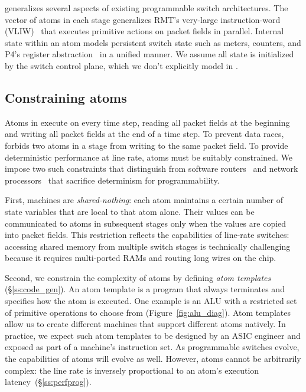 \absmachine generalizes several aspects of existing programmable switch
architectures. The vector of atoms in each stage generalizes RMT's very-large
instruction-word (VLIW)~\cite{rmt} that executes primitive actions on packet
fields in parallel. Internal state within an atom models persistent switch
state such as meters, counters, and P4's register abstraction~\cite{p4spec} in
a unified manner. We assume all state is initialized by the switch control
plane, which we don't explicitly model in \absmachine.

\subsection{Constraining atoms}
\label{s:atomConstraints}

Atoms in \absmachine execute on every time step, reading all packet fields at
the beginning and writing all packet fields at the end of a time step. To
prevent data races, \absmachine forbids two atoms in a stage from writing to
the same packet field.  To provide deterministic performance at line rate,
atoms must be suitably constrained.  We impose two such constraints that
distinguish \absmachine from software routers~\cite{click} and network
processors~\cite{ixp4xx} that sacrifice determinism for programmability.

First, \absmachine machines are \textit{shared-nothing}: each atom maintains a
certain number of state variables that are local to that atom alone. Their
values can be communicated to atoms in subsequent stages only when the values
are copied into packet fields. This restriction reflects the capabilities of
line-rate switches: accessing shared memory from multiple switch stages is
technically challenging because it requires multi-ported RAMs and routing long
wires on the chip.

Second, we constrain the complexity of atoms by defining {\it atom templates}
(\S\ref{ss:code_gen}).  An atom template is a program that always terminates
and specifies how the atom is executed. One example is an ALU with a restricted
set of primitive operations to choose from (Figure~\ref{fig:alu_diag}). Atom
templates allow us to create different \absmachine machines that support
different atoms natively. In practice, we expect such atom templates to be
designed by an ASIC engineer and exposed as part of a \absmachine machine's
instruction set. As programmable switches evolve, the capabilities of atoms
will evolve as well. However, atoms cannot be arbitrarily complex: the line
rate is inversely proportional to an atom's execution
latency~(\S\ref{ss:perfprog}).
